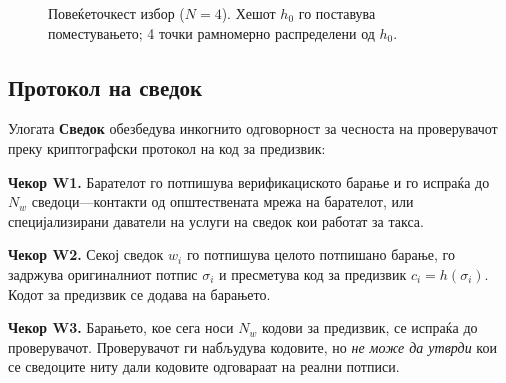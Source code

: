 \documentclass[11pt,a4paper,twocolumn]{article}
\begin{document}
\begin{figure}[ht]
\centering
{}
\caption{Повеќеточкест избор ($N{=}4$). Хешот $h_0$ го поставува поместувањето; 4 точки рамномерно распределени од $h_0$.}
\label{fig:multipoint}
\end{figure}

\subsection{Протокол на сведок}

Улогата \textbf{Сведок} обезбедува инкогнито одговорност за чесноста на проверувачот преку криптографски протокол на код за предизвик:

\textbf{Чекор W1.} Барателот го потпишува верификациското барање и го испраќа до $N_w$ сведоци---контакти од општествената мрежа на барателот, или специјализирани даватели на услуги на сведок кои работат за такса.

\textbf{Чекор W2.} Секој сведок $w_i$ го потпишува целото потпишано барање, го задржува оригиналниот потпис $\sigma_i$ и пресметува код за предизвик $c_i = h(\sigma_i)$. Кодот за предизвик се додава на барањето.

\textbf{Чекор W3.} Барањето, кое сега носи $N_w$ кодови за предизвик, се испраќа до проверувачот. Проверувачот ги набљудува кодовите, но \emph{не може да утврди} кои се сведоците ниту дали кодовите одговараат на реални потписи.
\end{document}
